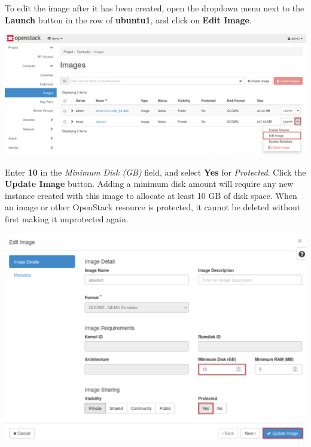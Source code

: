 \documentclass[letterpaper, 12pt]{article}
\begin{document}
\begin{enumerate}
    \begin{labstep}
        To edit the image after it has been created, open the dropdown menu next to the \textbf{Launch} button in the row of \textbf{ubuntu1}, and click on \textbf{Edit Image}.

        \begin{center}
            \includegraphics[width=\linewidth]{images/part1/step9.png}
        \end{center}
    \end{labstep}

    \begin{labstep}
        Enter \textbf{10} in the \textit{Minimum Disk (GB)} field, and select \textbf{Yes} for \textit{Protected}.
        Click the \textbf{Update Image} button.
        Adding a minimum disk amount will require any new instance created with this image to allocate at least 10 GB of disk space.
        When an image or other OpenStack resource is protected, it cannot be deleted without first making it unprotected again.

        \begin{center}
            \includegraphics[width=\linewidth]{images/part1/step10.png}
        \end{center}
    \end{labstep}


\end{enumerate}
\end{document}
